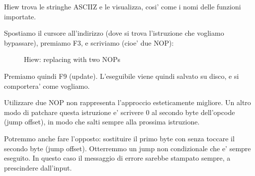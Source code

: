 Hiew trova le stringhe \ac{ASCIIZ} e le visualizza, cosi' come i nomi delle funzioni importate.

\clearpage
Spostiamo il cursore all'indirizzo  (dove si trova l'istruzione  che vogliamo bypassare), premiamo F3, e scriviamo  (cioe' due \ac{NOP}):

\begin{figure}[H]
\centering
{}
\caption{Hiew: replacing  with two \ac{NOP}s}
\label{fig:scanf_ex3_hiew_2}
\end{figure}

Premiamo quindi F9 (update). L'eseguibile viene quindi salvato su disco, e si comportera' come vogliamo.

Utilizzare due \ac{NOP} non rappresenta l'approccio esteticamente migliore.
Un altro modo di patchare questa istruzione e' scrivere 0 al secondo byte dell'opcode (\gls{jump offset}), 
in modo che  salti sempre alla prossima istruzione.

Potremmo anche fare l'opposto: sostituire il primo byte con  senza toccare il secondo byte (\gls{jump offset}).
Otterremmo un jump non condizionale che e' sempre eseguito.
In questo caso il messaggio di errore sarebbe stampato sempre, a prescindere dall'input.

